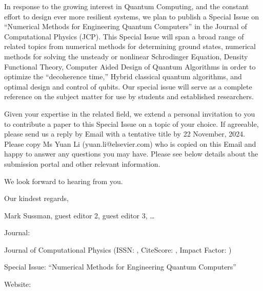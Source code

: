 \documentclass[]{article}
\begin{document}
In response to the growing interest in Quantum Computing, and the constant effort to design ever more resilient systems, we plan to publish a Special Issue on ``Numerical Methods for Engineering Quantum Computers'' in the Journal of Computational Physics (JCP). This Special Issue will span a broad range of related topics from numerical methods for determining ground states, numerical methods for solving the unsteady or nonlinear Schrodinger Equation, Density Functional Theory, Computer Aided Design of Quantum Algorithms in order to optimize the ``decoherence time,'' Hybrid classical quantum algorithms, and optimal design and control of qubits. Our special issue will serve as a complete reference on the subject matter for use by students and established researchers. \\

\par\noindent
Given your expertise in the related field, we extend a personal invitation to you to contribute a paper to this Special Issue on a topic of your choice. If agreeable, please send us a reply by Email with a tentative title by 22 November, 2024. Please copy Ms Yuan Li (yuan.li@elsevier.com) who is copied on this Email and happy to answer any questions you may have. Please see below details about the submission portal and other relevant information. \\

\par\noindent
We look forward to hearing from you. \\
\par\noindent

Our kindest regards, \\
\par\noindent

Mark Sussman, guest editor 2, guest editor 3, \ldots \\
\par\noindent

Journal:
\par\noindent

Journal of Computational Physics (ISSN: , CiteScore: , Impact Factor: ) \\
\par\noindent

Special Issue: ``Numerical Methods for Engineering Quantum Computers''
\par\noindent

Website: 
\par\noindent
\end{document}
